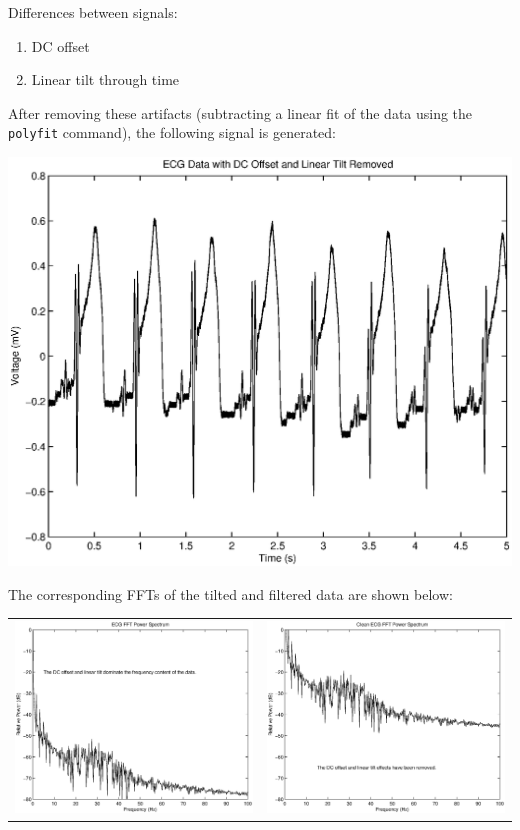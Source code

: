 Differences between signals:
\begin{enumerate}
\item DC offset
\item Linear tilt through time
\end{enumerate}

After removing these artifacts (subtracting a linear fit of the data using the \verb+polyfit+ command), the following signal is generated:

\begin{center}
\includegraphics[width=0.5\linewidth]{ecg_data/ecg_dat_clean.eps}
\end{center}

The corresponding FFTs of the tilted and filtered data are shown below:

\begin{center}
\begin{tabular}{cc}
\includegraphics[width=0.5\linewidth]{ecg_data/ecg_fft.eps} &
\includegraphics[width=0.5\linewidth]{ecg_data/ecg_fft_clean.eps} \\
\end{tabular}
\end{center}

